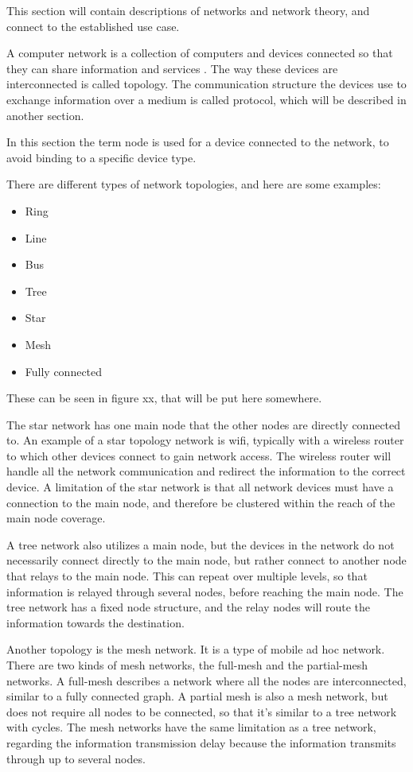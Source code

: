 This section will contain descriptions of networks and network theory, and connect to the established use case.

A computer network is a collection of computers and devices connected so that they can share information and services \cite{mansfield2009computer}. The way these devices are interconnected is called topology. The communication structure the devices use to exchange information over a medium is called protocol, which will be described in another section.

In this section the term node is used for a device connected to the network, to avoid binding to a specific device type.

There are different types of network topologies, and here are some examples:
\begin{itemize}
	\item Ring
	\item Line
	\item Bus
	\item Tree
	\item Star
	\item Mesh
	\item Fully connected
\end{itemize}

These can be seen in figure xx, that will be put here somewhere. %

The star network has one main node that the other nodes are directly connected to. An example of a star topology network is wifi, typically with a wireless router to which other devices connect to gain network access. The wireless router will handle all the network communication and redirect the information to the correct device. A limitation of the star network is that all network devices must have a connection to the main node, and therefore be clustered within the reach of the main node coverage. \cite{todo}

A tree network also utilizes a main node, but the devices in the network do not necessarily connect directly to the main node, but rather connect to another node that relays to the main node. This can repeat over multiple levels, so that information is relayed through several nodes, before reaching the main node. The tree network has a fixed node structure, and the relay nodes will route the information towards the destination. \cite{todo}

Another topology is the mesh network. It is a type of mobile ad hoc network. There are two kinds of mesh networks, the full-mesh and the partial-mesh networks. A full-mesh describes a network where all the nodes are interconnected, similar to a fully connected graph. A partial mesh is also a mesh network, but does not require all nodes to be connected, so that it's similar to a tree network with cycles. The mesh networks have the same limitation as a tree network, regarding the information transmission delay because the information transmits through up to several nodes. \cite{g2wmn}

